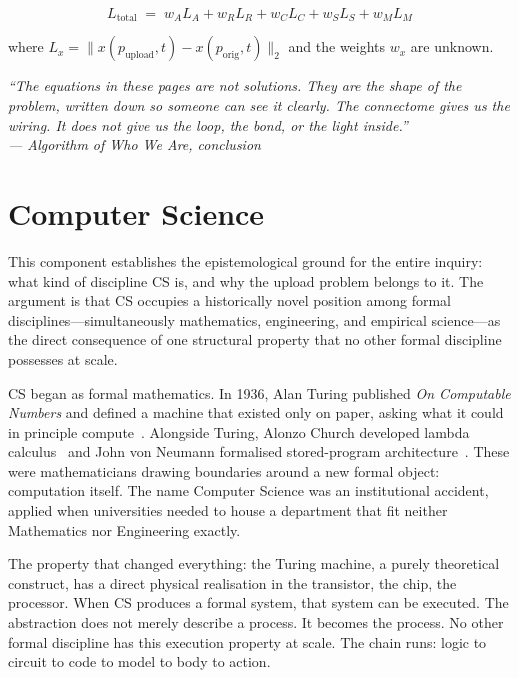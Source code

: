 \documentclass[12pt, a4paper]{article}
\begin{document}
\begin{equation}
L_{\mathrm{total}} \;=\;
    w_A L_A + w_R L_R + w_C L_C + w_S L_S + w_M L_M
\end{equation}

where $L_x = \|x(p_{\mathrm{upload}},t) - x(p_{\mathrm{orig}},t)\|_2$ and the weights $w_x$ are
unknown.

\begin{displayquote}
\itshape
``The equations in these pages are not solutions. They are the shape of the problem, written down so
someone can see it clearly. The connectome gives us the wiring. It does not give us the loop, the
bond, or the light inside.''\\
\upshape --- Algorithm of Who We Are, conclusion
\end{displayquote}

\section{Computer Science}

This component establishes the epistemological ground for the entire inquiry: what kind of discipline
CS is, and why the upload problem belongs to it. The argument is that CS occupies a historically
novel position among formal disciplines---simultaneously mathematics, engineering, and empirical
science---as the direct consequence of one structural property that no other formal discipline
possesses at scale.

CS began as formal mathematics. In 1936, Alan Turing published \textit{On Computable Numbers} and
defined a machine that existed only on paper, asking what it could in principle compute~\cite{CS-1}.
Alongside Turing, Alonzo Church developed lambda calculus~\cite{CS-2} and John von Neumann
formalised stored-program architecture~\cite{CS-3}. These were mathematicians drawing boundaries
around a new formal object: computation itself. The name Computer Science was an institutional
accident, applied when universities needed to house a department that fit neither Mathematics nor
Engineering exactly.

The property that changed everything: the Turing machine, a purely theoretical construct, has a
direct physical realisation in the transistor, the chip, the processor. When CS produces a formal
system, that system can be executed. The abstraction does not merely describe a process. It becomes
the process. No other formal discipline has this execution property at scale. The chain runs: logic to
circuit to code to model to body to action.
\end{document}
